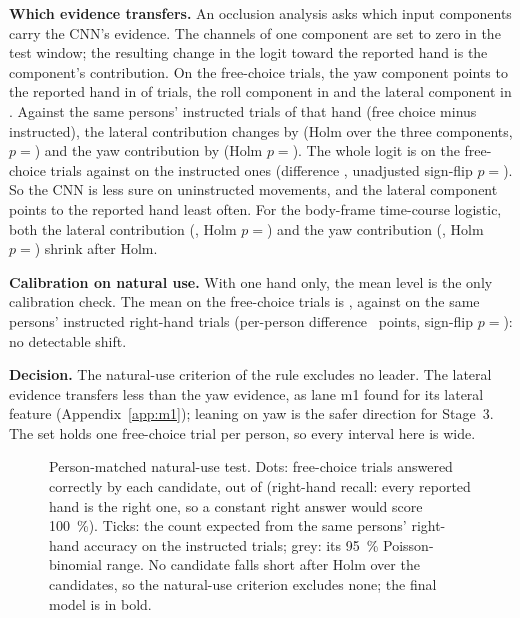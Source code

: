 \textbf{Which evidence transfers.}
An occlusion analysis asks which input components carry the CNN's evidence.
The channels of one component are set to zero in the test window; the resulting change in the logit toward the reported hand is the component's contribution.
On the free-choice trials, the yaw component points to the reported hand in  of  trials, the roll component in  and the lateral component in .
Against the same persons' instructed trials of that hand (free choice minus instructed), the lateral contribution changes by  (Holm over the three components, $p = {}$) and the yaw contribution by  (Holm $p = {}$).
The whole logit is  on the free-choice trials against  on the instructed ones (difference , unadjusted sign-flip $p = {}$).
So the CNN is less sure on uninstructed movements, and the lateral component points to the reported hand least often.
For the body-frame time-course logistic, both the lateral contribution (, Holm $p = {}$) and the yaw contribution (, Holm $p = {}$) shrink after Holm.

\textbf{Calibration on natural use.}
With one hand only, the mean level is the only calibration check.
The mean \pright{} on the free-choice trials is , against  on the same persons' instructed right-hand trials (per-person difference ~points, sign-flip $p = {}$): no detectable shift.

\textbf{Decision.}
The natural-use criterion of the rule excludes no leader.
The lateral evidence transfers less than the yaw evidence, as lane m1 found for its lateral feature (Appendix~\ref{app:m1}); leaning on yaw is the safer direction for Stage~3.
The set holds one free-choice trial per person, so every interval here is wide.

\begin{figure}[htbp]
  \centering
  \caption{Person-matched natural-use test.
    Dots: free-choice trials answered correctly by each candidate, out of  (right-hand recall: every reported hand is the right one, so a constant right answer would score 100~\%).
    Ticks: the count expected from the same persons' right-hand accuracy on the instructed trials; grey: its 95~\% Poisson-binomial range.
    No candidate falls short after Holm over the candidates, so the natural-use criterion excludes none; the final model is in bold.}
  \label{fig:FINAL_07_natural_transfer}\label{fig:app:final-natural}
\end{figure}

